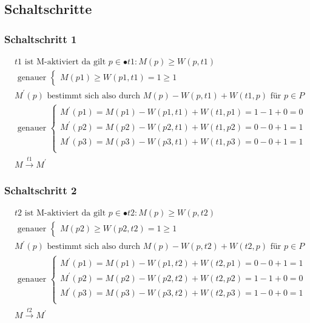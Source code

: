 \documentclass[10pt]{scrartcl}
\begin{document}
	\subsection{Schaltschritte}
	
	\subsubsection{Schaltschritt 1}	
		\begin{align}	
			&t1 \text{ ist M-aktiviert da gilt } p \in \bullet t1:M(p) \geq W(p,t1)\\
			&\text{ genauer }\begin{cases}
				M(p1) \geq W(p1,t1) = 1 \geq 1	
			\end{cases}\\
			&M^{'}(p) \text{ bestimmt sich also durch } M(p) - W(p,t1) + W(t1,p) \text{ für }  p \in P\\
			&\text{ genauer }\begin{cases}
				M^{'}(p1) = M(p1) - W(p1,t1) + W(t1,p1) = 1 - 1 + 0 = 0\\
				M^{'}(p2) = M(p2) - W(p2,t1) + W(t1,p2) = 0 - 0 + 1 = 1\\ 
				M^{'}(p3) = M(p3) - W(p3,t1) + W(t1,p3) = 0 - 0 + 1 = 1\\ 
			\end{cases}\\
			&M\overset{t1}{\rightarrow}M^{'}			
		\end{align}
		
	\subsubsection{Schaltschritt 2}
		\begin{align}	
			&t2 \text{ ist M-aktiviert da gilt } p \in \bullet t2:M(p) \geq W(p,t2)\\
			&\text{ genauer }\begin{cases}
				M(p2) \geq W(p2,t2) = 1 \geq 1	
			\end{cases}\\
			&M^{'}(p) \text{ bestimmt sich also durch } M(p) - W(p,t2) + W(t2,p) \text{ für }  p \in P\\
			&\text{ genauer }\begin{cases}
				M^{'}(p1) = M(p1) - W(p1,t2) + W(t2,p1) = 0 - 0 + 1 = 1\\
				M^{'}(p2) = M(p2) - W(p2,t2) + W(t2,p2) = 1 - 1 + 0 = 0\\ 
				M^{'}(p3) = M(p3) - W(p3,t2) + W(t2,p3) = 1 - 0 + 0 = 1\\ 
			\end{cases}\\
			&M\overset{t2}{\rightarrow}M^{'}			
		\end{align}
		
\end{document}
